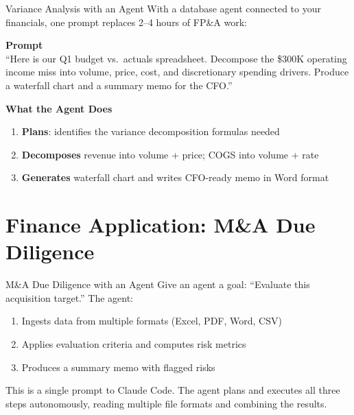 \documentclass[aspectratio=169]{beamer}
\begin{document}
\begin{frame}[shrink=5]{Variance Analysis with an Agent}
With a database agent connected to your financials, one prompt replaces 2--4 hours of FP\&A work:
\vspace{0.2cm}

\textbf{Prompt}\\[0.3em]
\small ``Here is our Q1 budget vs.\ actuals spreadsheet. Decompose the \$300K operating income miss into volume, price, cost, and discretionary spending drivers.  Produce a waterfall chart and a summary memo for the CFO.''
\normalsize
\vspace{0.2cm}

\textbf{What the Agent Does}
\begin{enumerate}\small
  \item \textbf{Plans}: identifies the variance decomposition formulas needed
  \item \textbf{Decomposes} revenue into volume + price; COGS into volume + rate
  \item \textbf{Generates} waterfall chart and writes CFO-ready memo in Word format
\end{enumerate}
\end{frame}

\section{Finance Application: M\&A Due Diligence}

\begin{frame}{M\&A Due Diligence with an Agent}
Give an agent a goal: ``Evaluate this acquisition target.'' The agent:
\vspace{0.3cm}
\begin{enumerate}
  \item Ingests data from multiple formats (Excel, PDF, Word, CSV)
  \item Applies evaluation criteria and computes risk metrics
  \item Produces a summary memo with flagged risks
\end{enumerate}
\vspace{0.3cm}
\alert{This is a single prompt to Claude Code.} The agent plans and executes all three steps autonomously, reading multiple file formats and combining the results.
\end{frame}
\end{document}
